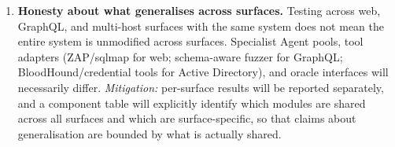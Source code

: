 \begin{enumerate}
	\item \textbf{Honesty about what generalises across surfaces.} Testing across web, GraphQL, and multi-host surfaces with the same system does not mean the entire system is unmodified across surfaces. Specialist Agent pools, tool adapters (ZAP/sqlmap for web; schema-aware fuzzer for GraphQL; BloodHound/credential tools for Active Directory), and oracle interfaces will necessarily differ. \textit{Mitigation:} per-surface results will be reported separately, and a component table will explicitly identify which modules are shared across all surfaces and which are surface-specific, so that claims about generalisation are bounded by what is actually shared.
\end{enumerate}
